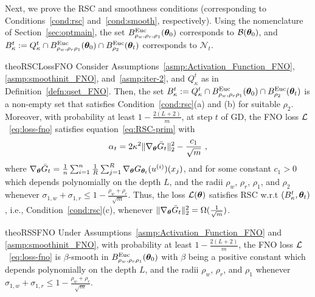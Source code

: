 Next, we prove the RSC and smoothness conditions (corresponding to Conditions~\ref{cond:rsc} and~\ref{cond:smooth}, respectively). 
%
Using the nomenclature of Section~\ref{sec:optmain}, the set $B^{\mathrm{Euc}}_{\rho_w,\rho_r,\rho_1}({\bm{\theta}}_0)$ corresponds to $\mathcal{B}({\bm{\theta}}_0)$, and 
$B^t_{\kappa} := Q_{\kappa}^t \cap B^{\mathrm{Euc}}_{\rho_w,\rho_r\rho_1}({\bm{\theta}}_0) \cap B^{\mathrm{Euc}}_{\rho_2}({\bm{\theta}}_t)$ corresponds to $\mathcal{N}_t$.

\begin{restatable}{theo}{RSCLossFNO}
Consider Assumptions~\ref{asmp:Activation_Function_FNO}, \ref{asmp:smoothinit_FNO}, and~\ref{asmp:iter-2}, and $Q^t_{\kappa}$ as in Definition~\ref{defn:qset_FNO}. Then, the set $B^t_{\kappa} := Q_{\kappa}^t \cap B^{\mathrm{Euc}}_{\rho_w,\rho_r\rho_1}({\bm{\theta}}_0) \cap B^{\mathrm{Euc}}_{\rho_2}({\bm{\theta}}_t)$ is a non-empty set that satisfies Condition~\ref{cond:rsc}(a) and (b) for suitable $\rho_2$. 
Moreover, 
with probability at least $1-\frac{2(L + 2)}{m}$, at step $t$ of GD,  
the FNO loss ${\mathcal{L}}$~\eqref{eq:loss-fno} satisfies 
equation~\eqref{eq:RSC-prim} with
\begin{equation}
\alpha_t = 2\kappa^2 \| \nabla_{{\bm{\theta}}} \bar{G}_t \|_2^2 - \frac{c_1}{\sqrt{m}}~,
        \label{eq:RSCLoss_FNO}
\end{equation}
where $\nabla_{{\bm{\theta}}}\bar{G}_t = \frac{1}{n} \sum_{i=1}^n \frac{1}{R}  \sum_{j=1}^{R} \nabla_{{\bm{\theta}}}G_{{\bm{\theta}}_t}(u^{(i)})(x_j)$, and for some constant $c_1 >0$ 
which depends polynomially on the depth $L$, and the radii $\rho_w$, $\rho_r$, $\rho_1$, and $\rho_2$ whenever $\sigma_{1,w}+\sigma_{1,r}\leq 1-\frac{\rho_w+\rho_r}{\sqrt{m}}$.
%
Thus, the loss ${\mathcal{L}}({\bm{\theta}})$ satisfies RSC w.r.t $(B_{\kappa}^t, {\bm{\theta}}_t)$, i.e., Condition~\ref{cond:rsc}(c), whenever $\| \nabla_{{\bm{\theta}}} \bar{G}_t \|_2^2 = \Omega(\frac{1}{\sqrt{m}})$.
\label{theo:rsc_main_fno}
\end{restatable}
%

\begin{restatable}{theo}{RSSFNO}
Under Assumptions~\ref{asmp:Activation_Function_FNO} and \ref{asmp:smoothinit_FNO}, with probability at least $ 1 - \frac{2(L+2)}{m}$, the FNO loss ${\cal L}$~\eqref{eq:loss-fno} is $\beta$-smooth in $B^{\mathrm{Euc}}_{\rho_w,\rho_r\rho_1}({\bm{\theta}}_0)$ with $\beta$ being a positive constant which 
%
depends polynomially on the depth $L$, and the radii $\rho_w$, $\rho_r$, and $\rho_1$ whenever $\sigma_{1,w}+\sigma_{1,r}\leq 1-\frac{\rho_w+\rho_r}{\sqrt{m}}$.
%
\label{theo:smooth_main_fno}
\end{restatable}

